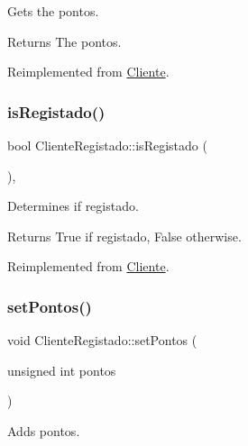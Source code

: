 Gets the pontos. 

\begin{DoxyReturn}{Returns}
The pontos. 
\end{DoxyReturn}


Reimplemented from \hyperlink{classCliente_a4bcd51f0d9a0bfe7d9d47074ac4e65de}{Cliente}.

\mbox{\label{classClienteRegistado_a3dade20423acb0e84c9fbe30c75f0e3e}} 
\subsubsection{\texorpdfstring{is\+Registado()}{isRegistado()}}
{\footnotesize\ttfamily bool Cliente\+Registado\+::is\+Registado (\begin{DoxyParamCaption}{ }\end{DoxyParamCaption})\hspace{0.3cm}{\ttfamily [inline]}, {\ttfamily [virtual]}}



Determines if registado. 

\begin{DoxyReturn}{Returns}
True if registado, False otherwise. 
\end{DoxyReturn}


Reimplemented from \hyperlink{classCliente_acb60d8bf04134b986ae56a79db8beaaf}{Cliente}.

\mbox{\label{classClienteRegistado_a93d79ba4ecd6716124c832fc2f38ddc5}} 
\subsubsection{\texorpdfstring{set\+Pontos()}{setPontos()}}
{\footnotesize\ttfamily void Cliente\+Registado\+::set\+Pontos (\begin{DoxyParamCaption}\item[{unsigned int}]{pontos }\end{DoxyParamCaption})\hspace{0.3cm}{\ttfamily [virtual]}}



Adds pontos. 



